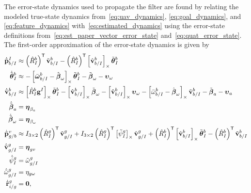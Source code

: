 The error-state dynamics used to propagate the filter are found by relating
the modeled true-state dynamics from~\eqref{eq:uav_dynamics},
\eqref{eq:goal_dynamics}, and \eqref{eq:feature_dynamics}
with~\eqref{eq:estimated_dynamics} using the error-state definitions
from~\eqref{eq:est_paper_vector_error_state} and~\eqref{eq:quat_error_state}. The
first-order approximation of the error-state dynamics is given by 
\begin{align}
  \dot{\tilde{\boldsymbol{\mathrm{p}}}}_{b/I}^I
  &\approx
  \left( \hat{R}_I^b \right)^{\mathsf{T}} \tilde{\boldsymbol{\mathrm{v}}}_{b/I}^b
  - \left( \hat{R}_I^b \right)^{\mathsf{T}} \left[ \hat{\boldsymbol{\mathrm{v}}}_{b/I}^b \right]_{\times}
  \tilde{\boldsymbol{\mathrm{\theta}}}_I^b
  \\
  \dot{\tilde{\boldsymbol{\mathrm{\theta}}}}_{I}^{b} 
  &\approx 	
  -\left[  \bar{\boldsymbol{\mathrm{\omega}}}_{b/I}^b - \hat{\boldsymbol{\mathrm{\beta}}}_\omega \right]_{\times}
    \tilde{\boldsymbol{\mathrm{\theta}}}_I^b
    - \tilde{\boldsymbol{\mathrm{\beta}}}_\omega -
    \boldsymbol{\mathrm{\upsilon}}_\omega
  \nonumber \\
  \dot{\tilde{\boldsymbol{\mathrm{v}}}}_{b/I}^b 
  &\approx
  \left[  \hat{R}_I^b \boldsymbol{\mathrm{g}}^I  \right]_{\times} \tilde{\boldsymbol{\mathrm{\theta}}}_I^b 
  -
  \left[  \hat{\boldsymbol{\mathrm{v}}}_{b/I}^b  \right]_{\times} \tilde{\boldsymbol{\mathrm{\beta}}}_\omega
  -
  \left[  \hat{\boldsymbol{\mathrm{v}}}_{b/I}^b  \right]_{\times} \boldsymbol{\mathrm{\upsilon}}_\omega
  -
  \left[  \bar{\omega}_{b/I}^b - \hat{\boldsymbol{\mathrm{\beta}}}_\omega  \right]_{\times}
  \tilde{\boldsymbol{\mathrm{v}}}_{b/I}^b
  -
  \tilde{\boldsymbol{\mathrm{\beta}}}_a
  -
  \boldsymbol{\mathrm{\upsilon}}_a \nonumber
  \\
  \dot{\tilde{\boldsymbol{\mathrm{\beta}}}}_a &= \boldsymbol{\mathrm{\eta}}_{\beta_a} \nonumber
  \\
  \dot{\tilde{\boldsymbol{\mathrm{\beta}}}}_\omega &= \boldsymbol{\mathrm{\eta}}_{\beta_\omega} \nonumber
  \\
  \dot{\tilde{\boldsymbol{\mathrm{p}}}}_{g/b}^{v}
                                  &\approx
  I_{3 \times 2} \left( \hat{R}_{I}^{g} \right)^{\mathsf{T}}
  \tilde{\boldsymbol{\mathrm{v}}}_{g/I}^g
  +
  I_{3 \times 2} \left( \hat{R}_{I}^{g} \right)^{\mathsf{T}}
  \left[  \tilde{\psi}_I^g  \right]_{\times} \hat{\boldsymbol{\mathrm{v}}}_{g/I}^g
  +
  \left( \hat{R}_{I}^{b} \right)^{\mathsf{T}} \left[  \hat{\boldsymbol{\mathrm{v}}}_{b/I}^{b}  \right]_{\times} 
  \tilde{\boldsymbol{\mathrm{\theta}}}_I^b
  -
  \left( \hat{R}_{I}^{b} \right)^{\mathsf{T}} \tilde{\boldsymbol{\mathrm{v}}}_{b/I}^{b} \nonumber \\
  \dot{\tilde{\boldsymbol{\mathrm{v}}}}_{g/I}^{g} &= \boldsymbol{\mathrm{\eta}}_{gv} \nonumber \\
  \dot{\tilde{\psi}}_{I}^{g} &= \tilde{\omega}_{g/I}^g \nonumber \\
  \dot{\tilde{\omega}}_{g/I}^{g} &= \eta_{g\omega} \nonumber \\
  \dot{\tilde{\boldsymbol{\mathrm{r}}}}_{i/g}^g &= \boldsymbol{\mathrm{0}}, \nonumber
\end{align}
